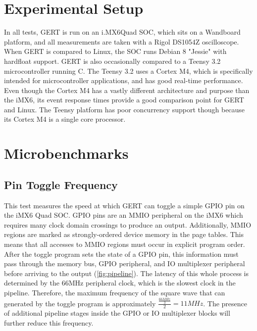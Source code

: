 \section{Experimental Setup} \label{sec:setup}
In all tests, GERT is run on an i.MX6Quad SOC, which sits on a Wandboard
platform, and all measurements are taken
with a Rigol DS1054Z oscilloscope. When GERT is compared to Linux, the SOC
runs Debian 8 "Jessie" with hardfloat support. GERT is also occasionally
compared to a Teensy 3.2 microcontroller running C. The Teensy 3.2 \cite{teensy} uses a Cortex M4, which is specifically
intended for microcontroller applications, and has good real-time performance. Even though
the Cortex M4 has a vastly different architecture and purpose than the iMX6, its event
response times provide a good comparison point for GERT and Linux.
The Teensy platform
has poor concurrency support though because its Cortex M4 is a single core processor.



\section{Microbenchmarks}

\subsection{Pin Toggle Frequency}\label{sec:pin_toggle}
This test measures the speed at which GERT can toggle a simple GPIO pin on
the iMX6 Quad SOC. GPIO pins are an MMIO peripheral on the iMX6 which requires
many clock domain crossings to produce an output. Additionally, MMIO regions are marked as strongly-ordered
device memory in the page tables. This means that all accesses to MMIO regions must occur in explicit program order.
After the toggle program sets
the state of a GPIO pin, this information must pass through the memory bus,
GPIO peripheral, and IO multiplexer peripheral before arriving to the output (\ref{fig:pipeline}).
The latency of this whole process is determined by the 66MHz peripheral clock,
which is the slowest clock in the pipeline. Therefore, the maximum frequency
of the square wave that can generated by the toggle program is approximately $\frac{\frac{66MHz}{3}}{2}=11MHz$. The presence
of additional pipeline stages inside the GPIO or IO multiplexer blocks will further
reduce this frequency.

